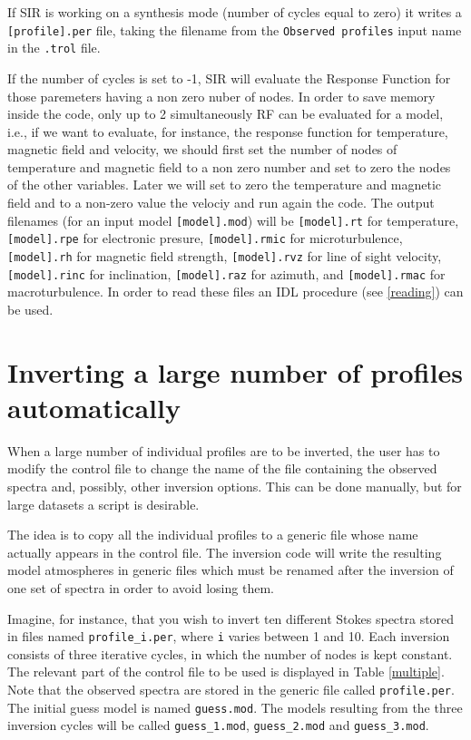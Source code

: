 If SIR is working on a synthesis mode (number of cycles equal to zero)
it writes a {\tt [profile].per} file, taking the filename
from the  {\tt Observed profiles} input name in the {\tt .trol} file.

If the number of cycles is set to -1, SIR will evaluate 
the Response Function for those paremeters having a non zero 
nuber of nodes. 
In order to save memory inside the code, only up to 2 simultaneously
RF can be evaluated for a model, i.e., if we want to evaluate, for instance,
the response function for temperature, magnetic field and velocity,
we should first set the number of nodes of temperature and magnetic field
to a non zero number and set to zero the nodes of the other variables. Later
we will set to zero the temperature and magnetic field and to 
a non-zero value the velociy and run again the code.
The output filenames (for an input model {\tt[model].mod})
will be {\tt[model].rt} for temperature, {\tt[model].rpe} for
electronic presure, {\tt[model].rmic} for microturbulence, {\tt[model].rh} for magnetic field strength,
{\tt[model].rvz} for line of sight velocity, {\tt[model].rinc} for inclination, {\tt[model].raz} for azimuth,
and {\tt[model].rmac} for macroturbulence. 
In order to read these files an IDL procedure (see \ref{reading}) can be used.

\section{Inverting a large number of profiles automatically}
\label{corremuchos}
When a large number of individual profiles are to be inverted, the
user has to modify the control file to change the name of the 
file containing the observed spectra and, possibly, other inversion
options. This can be done manually, but for large datasets a 
script is desirable.  

The idea is to copy all the individual profiles to a generic file whose
name actually appears in the control file. The inversion code will write the
resulting model atmospheres in generic files which must be renamed
after the inversion of one set of spectra in order to avoid losing them.

Imagine, for instance, that you wish to invert ten 
different Stokes spectra stored in files named {\tt profile\_i.per}, 
where {\tt i} varies between 1 and 10. Each inversion consists of
three iterative cycles, in which the number of nodes is kept constant. 
The relevant part of the control file to be used is displayed in
Table \ref{multiple}. Note that the observed spectra are stored in
the generic file called {\tt profile.per}. The initial guess model is named
{\tt guess.mod}. The models resulting from the three inversion
cycles will be called {\tt guess\_1.mod}, {\tt guess\_2.mod} and
{\tt guess\_3.mod}. 


